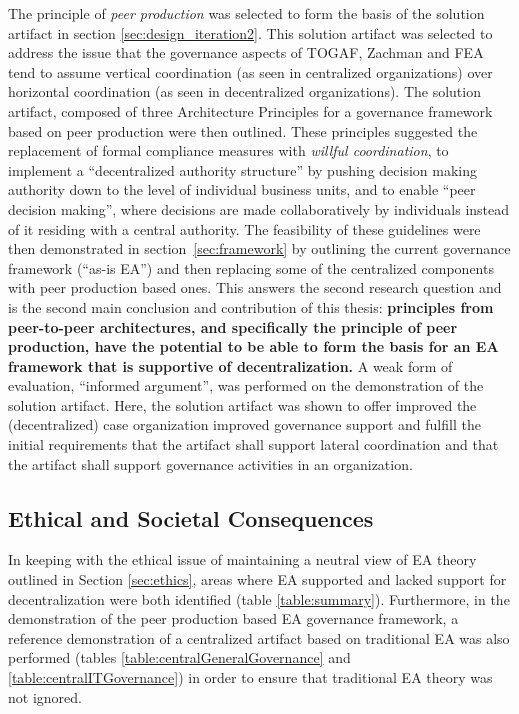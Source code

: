 The principle of \textit{peer production} was selected to form the basis of the solution artifact in section \ref{sec:design_iteration2}. This solution artifact was selected to address the issue that the governance aspects of TOGAF, Zachman and FEA tend to assume vertical coordination (as seen in centralized organizations) over horizontal coordination (as seen in decentralized organizations). The solution artifact, composed of three Architecture Principles for a governance framework based on peer production were then outlined. These principles suggested the replacement of formal compliance measures with \textit{willful coordination}, to implement a ``decentralized authority structure'' by pushing decision making authority down to the level of individual business units, and to enable ``peer decision making'', where decisions are made collaboratively by individuals instead of it residing with a central authority. The feasibility of these guidelines were then demonstrated in section~\ref{sec:framework} by outlining the current governance framework (``as-is EA'') and then replacing some of the centralized components with peer production based ones. This answers the second research question and is the second main conclusion and contribution of this thesis: \textbf{principles from peer-to-peer architectures, and specifically the principle of peer production, have the potential to be able to form the basis for an EA framework that is supportive of decentralization.} A weak form of evaluation, ``informed argument'', was performed on the demonstration of the solution artifact. Here, the solution artifact was shown to offer improved the (decentralized) case organization improved governance support and fulfill the initial requirements that the artifact shall support lateral coordination and that the artifact shall support governance activities in an organization.

\subsection{Ethical and Societal Consequences}

In keeping with the ethical issue of maintaining a neutral view of EA theory outlined in Section \ref{sec:ethics}, areas where EA supported and lacked support for decentralization were both identified (table \ref{table:summary}). Furthermore, in the demonstration of the peer production based EA governance framework, a reference demonstration of a centralized artifact based on traditional EA was also performed (tables \ref{table:centralGeneralGovernance} and \ref{table:centralITGovernance}) in order to ensure that traditional EA theory was not ignored. 

